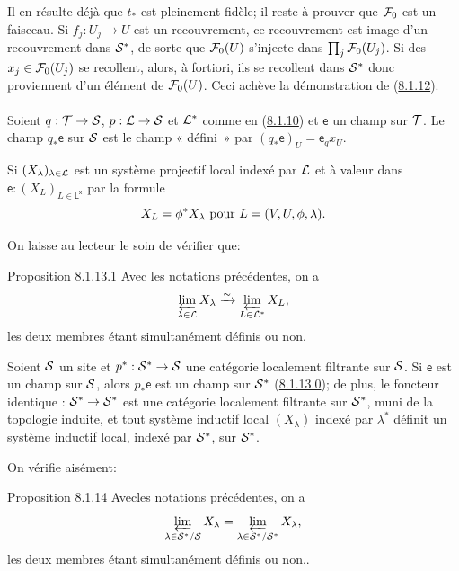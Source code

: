 \documentclass[10pt]{../fichiers-configuration-latex/smfart}
\begin{document}
Il en résulte déjà que $t_{\ast}$ est pleinement fidèle; il reste à prouver
que ${\mathcal F}_{0}$ est un faisceau. Si $f_j : U_j \to U$ est
un recouvrement, ce recouvrement est image d'un recouvrement dans
${\mathcal S}^{\ast}$, de sorte que ${\mathcal F}_{0}(U)$ s'injecte dans
$\prod_j {\mathcal F}_{0}(U_j)$. Si des $x_j
\in {\mathcal F}_{0}(U_j)$ se recollent, alors, à fortiori, ils se
recollent dans ${\mathcal S}^{\ast}$ donc proviennent d'un élément de
${\mathcal F}_{0}(U)$. Ceci achève la démonstration de (\hyperref[V.prop8.1.12]{8.1.12}).

\setcounter{subsubsection}{13}
\setcounter{paragraph}{-1}
\paragraph{}

Soient $q : \Tt \to \Ss$, $p : \Ll \to \Ss$ et
${\mathcal L}^{\ast}$ comme en (\hyperref[V.subsubsec8.1.10]{8.1.10}) et $\mathsf{e}$ un champ sur
${\mathcal T}$. Le champ $q_{\ast}\mathsf{e}$ sur ${\mathcal S}$ est le champ «
défini » par $(q_{\ast} \mathsf{e})_U = \mathsf{e}_q x_{U}$.

Si $(X_{\lambda})_{\lambda \in {\mathcal L}}$ est un système projectif
local indexé par ${\mathcal L}$ et à valeur dans $\mathsf{e} : (X_L)_{L
\in \mathsf{L^{x}}}$ par la formule
$$
X_L = \phi^{\ast} X_{\lambda} \text{ pour } L = (V, U, \phi, \lambda){}.
$$

On laisse au lecteur le soin de vérifier que:

\begin{enonce*}{Proposition 8.1.13.1}
Avec les notations précédentes, on a
$$
\varprojlim_{\lambda \in {\mathcal L}} X_{\lambda} \xrightarrow{\sim}
\varprojlim_{L \in {\mathcal L}^{\ast}} X_L{},
$$
les deux membres étant simultanément définis ou non.
\end{enonce*}

Soient ${\mathcal S}$ un site et $p^{\ast} : \Ss^{\ast} \to \Ss$ une catégorie localement
filtrante sur ${\mathcal S}$. Si $\mathsf{e}$ est un champ sur ${\mathcal S}$, alors $p_{\ast}
\mathsf{e}$ est un champ sur ${\mathcal S}^{\ast}$ (\hyperref[V.par8.1.13.0]{8.1.13.0}); de plus, le foncteur
identique : $\Ss^{\ast} \to \Ss^{\ast}$ est une catégorie localement filtrante sur
${\mathcal S}^{\ast}$, muni de la topologie induite, et tout système inductif local
$(X_{\lambda})$ indexé par $\lambda^{\ast}$ définit un système inductif
local, indexé par ${\mathcal S}^{\ast}$, sur ${\mathcal S}^{\ast}$.

On vérifie aisément:

\begin{enonce*}{Proposition 8.1.14}
Avec\pageoriginale les notations précédentes, on a
$$
\varprojlim_{\lambda \in {\mathcal S}^{\ast} /{\mathcal S}} X_{\lambda} =
\varprojlim_{\lambda \in {\mathcal S}^{\ast} /{\mathcal S}^{\ast}} X_{\lambda} {},
$$
les deux membres étant simultanément définis ou non..
\end{enonce*}
\end{document}
